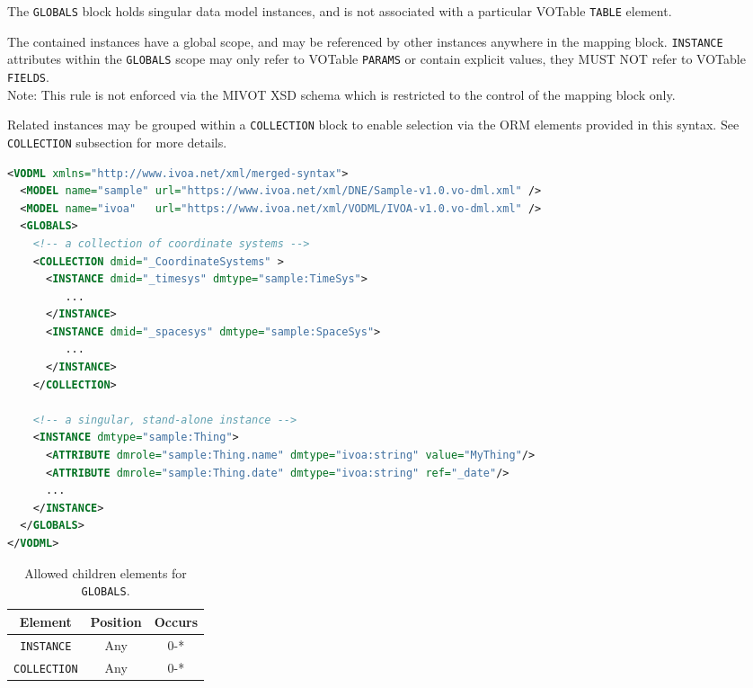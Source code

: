 The \texttt{GLOBALS} block holds singular data model instances, and is not associated 
with a particular VOTable \texttt{TABLE} element.

The contained instances have a global scope, and may be
referenced by other instances anywhere in the mapping block.  \texttt{INSTANCE} attributes
within the \texttt{GLOBALS} scope may only refer to VOTable \texttt{PARAMS} or contain
explicit values, they MUST NOT refer to VOTable \texttt{FIELDS}.  \\ 
Note: This rule is not enforced via the MIVOT XSD schema which is restricted to the control of the mapping block only.

Related instances may be grouped within a \texttt{COLLECTION} block to enable selection
via the ORM elements provided in this syntax.  See \texttt{COLLECTION} subsection for more details.

\begin{lstlisting}[caption={Example \texttt{GLOBALS} block.},language=XML]
<VODML xmlns="http://www.ivoa.net/xml/merged-syntax">
  <MODEL name="sample" url="https://www.ivoa.net/xml/DNE/Sample-v1.0.vo-dml.xml" />
  <MODEL name="ivoa"   url="https://www.ivoa.net/xml/VODML/IVOA-v1.0.vo-dml.xml" />
  <GLOBALS>
    <!-- a collection of coordinate systems -->
    <COLLECTION dmid="_CoordinateSystems" >
      <INSTANCE dmid="_timesys" dmtype="sample:TimeSys">
         ...
      </INSTANCE>
      <INSTANCE dmid="_spacesys" dmtype="sample:SpaceSys">
         ...
      </INSTANCE>
    </COLLECTION>

    <!-- a singular, stand-alone instance -->
    <INSTANCE dmtype="sample:Thing">
      <ATTRIBUTE dmrole="sample:Thing.name" dmtype="ivoa:string" value="MyThing"/>
      <ATTRIBUTE dmrole="sample:Thing.date" dmtype="ivoa:string" ref="_date"/>
      ...
    </INSTANCE>
  </GLOBALS>
</VODML>
\end{lstlisting}


\begin{table}[!htbp]
  \small
  \centering
  \begin{tabulary}{\linewidth}{|c |c |c|}
    \hline 
        \textbf{Element} &
        \textbf{Position} &
        \textbf{Occurs}\\
    \hline
    \hline
        \texttt{INSTANCE} &
        Any &
        0-*\\
    \hline
        \texttt{COLLECTION} &
        Any &
        0-*\\
    \hline
  \end{tabulary}
  \caption{Allowed children elements for \texttt{GLOBALS}.} 
  \label{tbl:globals-children}
 \end{table}
